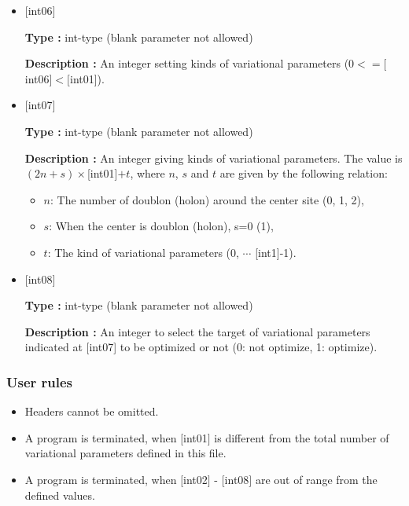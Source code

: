 \begin{itemize}
{\bf Description :} An integer giving a site index ($0<= [$int03$], [$int04$], [$int05$]<\verb|Nsite|$).
 
 \item  $[$int06$]$
   
   {\bf Type :} int-type (blank parameter not allowed)

  {\bf Description :} An integer setting kinds of variational  parameters ($0<= [$int06$]<[$int01]). 

 \item  $[$int07$]$
   
   {\bf Type :} int-type (blank parameter not allowed)

  {\bf Description :} An integer giving kinds of variational  parameters. The value is $(2n+s)\times$[int01]$+t$, where $n$, $s$ and $t$ are given by the following relation:
  \begin{itemize}
  \item{$n$}: The number of doublon (holon) around the center site (0, 1, 2),  \\
  \item{$s$}: When the center is doublon (holon), s=0 (1), \\
  \item{$t$}: The kind of variational parameters (0, $\cdots$ [int1]-1).
  \end{itemize}  
  
 \item  $[$int08$]$
   
   {\bf Type :} int-type (blank parameter not allowed)

  {\bf Description :} An integer to select the target of variational parameters indicated at [int07] to be optimized or not (0: not optimize, 1: optimize).
  
  
\end{itemize}

\subsubsection{User rules}
\begin{itemize}
\item Headers cannot be omitted. 
\item A program is terminated, when $[$int01$]$ is different from the total number of variational parameters defined in this file.
\item A program is terminated, when $[$int02$]$ - $[$int08$]$ are out of range from the defined values.
\end{itemize}

